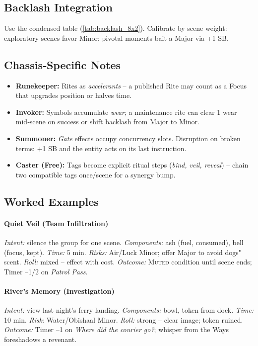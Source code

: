 \subsection{Backlash Integration}\label{subsec:ritual_backlash}
Use the condensed table (\autoref{tab:backlash_8x2}). Calibrate by scene weight: exploratory scenes favor Minor; pivotal moments bait a Major via +1 SB.

\subsection{Chassis‑Specific Notes}\label{subsec:ritual_chassis}
\begin{itemize}
    \item \textbf{Runekeeper:} Rites as \emph{accelerants} -- a published Rite may count as a Focus that upgrades position or halves time.
    \item \textbf{Invoker:} Symbols accumulate \emph{wear}; a maintenance rite can clear 1 wear mid‑scene on success or shift backlash from Major to Minor.
    \item \textbf{Summoner:} \emph{Gate} effects occupy concurrency slots. Disruption on broken terms: +1 SB and the entity acts on its last instruction.
    \item \textbf{Caster (Free):} Tags become explicit ritual steps (\emph{bind, veil, reveal}) -- chain two compatible tags once/scene for a synergy bump.
\end{itemize}

\subsection{Worked Examples}\label{subsec:ritual_examples}
\paragraph{Quiet Veil (Team Infiltration)} \emph{Intent:} silence the group for one scene. \emph{Components:} ash (fuel, consumed), bell (focus, kept). \emph{Time:} 5 min. \emph{Risks:} Air/Luck Minor; offer Major to avoid dogs" scent. \emph{Roll:} mixed -- effect with cost. \emph{Outcome:} \textsc{Muted} condition until scene ends; Timer --1/2 on \emph{Patrol Pass}.

\paragraph{River's Memory (Investigation)} \emph{Intent:} view last night's ferry landing. \emph{Components:} bowl, token from dock. \emph{Time:} 10 min. \emph{Risk:} Water/Obishaal Minor. \emph{Roll:} strong -- clear image; token ruined. \emph{Outcome:} Timer --1 on \emph{Where did the courier go?}; whisper from the Ways foreshadows a revenant.

